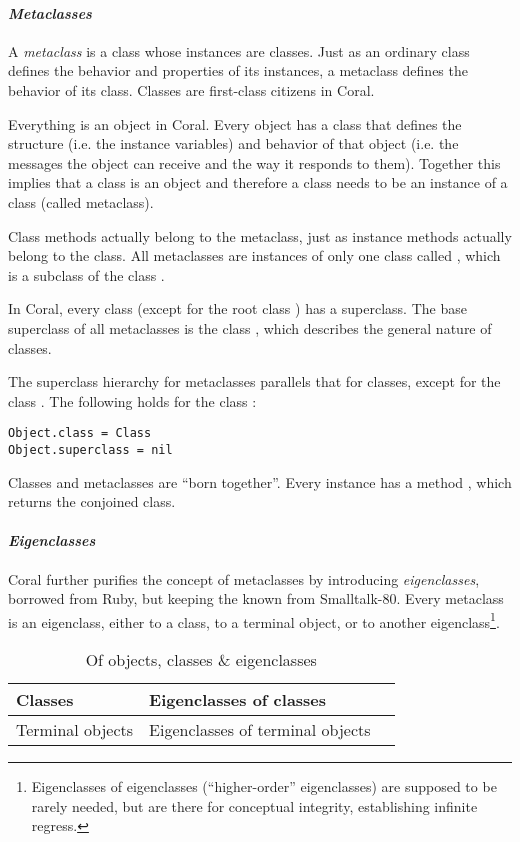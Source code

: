 \paragraph{\em Metaclasses}
A {\em metaclass} is a class whose instances are classes. Just as an ordinary class defines the behavior and properties of its instances, a metaclass defines the behavior of its class. Classes are first-class citizens in Coral. 

Everything is an object in Coral. Every object has a class that defines the structure (i.e. the instance variables) and behavior of that object (i.e. the messages the object can receive and the way it responds to them). Together this implies that a class is an object and therefore a class needs to be an instance of a class (called metaclass). 

Class methods actually belong to the metaclass, just as instance methods actually belong to the class. All metaclasses are instances of only one class called , which is a subclass of the class . 

In Coral, every class (except for the root class ) has a superclass. The base superclass of all metaclasses is the class , which describes the general nature of classes. 

The superclass hierarchy for metaclasses parallels that for classes, except for the class . The following holds for the class :
\begin{lstlisting}[deletekeywords={class}]
Object.class = Class
Object.superclass = nil
\end{lstlisting}

Classes and metaclasses are ``born together''. Every  instance has a method , which returns the conjoined class. 

\paragraph{\em Eigenclasses}
Coral further purifies the concept of metaclasses by introducing {\em eigenclasses}, borrowed from Ruby, but keeping the  known from Smalltalk-80. Every metaclass is an eigenclass, either to a class, to a terminal object, or to another eigenclass\footnote{Eigenclasses of eigenclasses (``higher-order'' eigenclasses) are supposed to be rarely needed, but are there for conceptual integrity, establishing infinite regress.}. 

\begin{table}[ht]
  \centering
  \caption{Of objects, classes \& eigenclasses}
  \renewcommand{\arraystretch}{1.7}
  \begin{tabular}{ | >{\centering}m{3.5cm} | >{\centering}m{3.5cm} | >{\centering\arraybackslash}m{6cm} | }
  	\hline
    Classes & Eigenclasses of classes & \multirow{2}{*}{Eigenclasses of eigenclasses} \\ \cline{1-2}
    Terminal objects & Eigenclasses of terminal objects & \\
    \hline
  \end{tabular}
\end{table}

